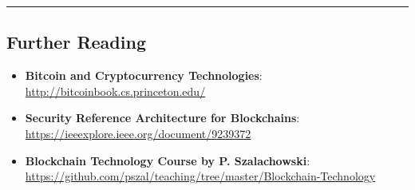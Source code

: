 \begin{center}\rule{0.5\linewidth}{0.5pt}\end{center}

\subsection{Further Reading}\label{further-reading}

\begin{itemize}
	\tightlist
	\item
	\textbf{Bitcoin and Cryptocurrency Technologies}:\\
	\url{http://bitcoinbook.cs.princeton.edu/}
	\item
	\textbf{Security Reference Architecture for Blockchains}:\\
	\url{https://ieeexplore.ieee.org/document/9239372}
	\item
	\textbf{Blockchain Technology Course by P. Szalachowski}:\\
	\url{https://github.com/pszal/teaching/tree/master/Blockchain-Technology}
\end{itemize}